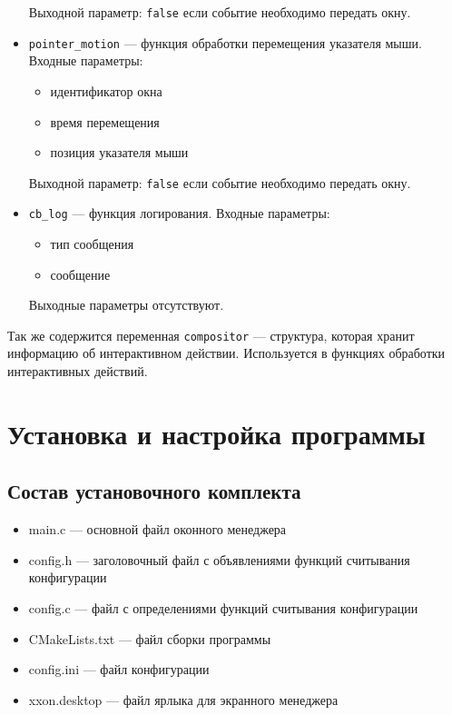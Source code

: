 \documentclass[10pt,a4paper]{report}
\begin{document}
\begin{itemize}
	Выходной параметр: \texttt{false} если событие необходимо передать окну.
	
\item \texttt{pointer\_motion} --- функция обработки перемещения указателя мыши.  Входные параметры:
	\begin{itemize}
	\item идентификатор окна
	\item время перемещения
	\item позиция указателя мыши
	\end{itemize}
	
	Выходной параметр: \texttt{false} если событие необходимо передать окну.
	
\item \texttt{cb\_log} --- функция логирования.  Входные параметры:
	\begin{itemize}
	\item тип сообщения
	\item сообщение
	\end{itemize}
	
	Выходные параметры отсутствуют.
\end{itemize}

Так же содержится переменная \texttt{compositor} --- структура, которая хранит информацию об интерактивном действии. Используется в функциях обработки интерактивных действий.

\section{Установка и настройка программы}
\subsection{Состав установочного комплекта}
\begin{itemize}
\item main.c --- основной файл оконного менеджера
\item config.h --- заголовочный файл с объявлениями функций считывания конфигурации
\item config.c --- файл с определениями функций считывания конфигурации
\item CMakeLists.txt --- файл сборки программы
\item config.ini --- файл конфигурации
\item xxon.desktop --- файл ярлыка для экранного менеджера
\end{itemize}
\end{document}
